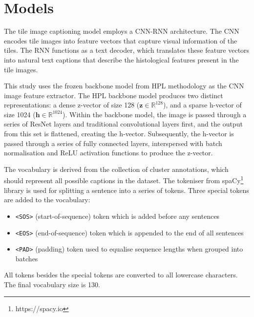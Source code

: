 \documentclass{l4proj}
\begin{document}
\section{Models} \label{sec:caption-model}

The tile image captioning model employs a CNN-RNN architecture. The CNN encodes tile images into feature vectors that capture visual information of the tiles. The RNN functions as a text decoder, which translates these feature vectors into natural text captions that describe the histological features present in the tile images.

This study uses the frozen backbone model from HPL methodology as the CNN image feature extractor. The HPL backbone model produces two distinct representations: a dense z-vector of size 128 ($\mathbf{z} \in \mathbb{R}^{128}$), and a sparse h-vector of size 1024 ($\mathbf{h} \in \mathbb{R}^{1024}$). Within the backbone model, the image is passed through a series of ResNet layers and traditional convolutional layers first, and the output from this set is flattened, creating the h-vector. Subsequently, the h-vector is passed through a series of fully connected layers, interspersed with batch normalisation and ReLU activation functions to produce the z-vector.


The vocabulary is derived from the collection of cluster annotations, which should represent all possible captions in the dataset. The tokeniser from spaCy\footnote{https://spacy.io} library is used for splitting a sentence into a series of tokens. Three special tokens are added to the vocabulary:
\begin{itemize}
    \item \verb|<SOS>| (start-of-sequence) token which is added before any sentences
    \item \verb|<EOS>| (end-of-sequence) token which is appended to the end of all sentences
    \item \verb|<PAD>| (padding) token used to equalise sequence lengths when grouped into batches
\end{itemize}
All tokens besides the special tokens are converted to all lowercase characters. The final vocabulary size is 130.
\end{document}
